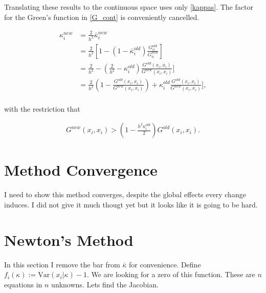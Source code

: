 \documentclass[paper=a4, fontsize=11pt]{scrartcl} %
\numberwithin{equation}{section} %
\numberwithin{figure}{section} %
\numberwithin{table}{section} %
\newcommand{\var}{\text{Var}}
\begin{document}
Translating these results to the continuous space uses only  \eqref{kappas}. The
factor for the Green's function in \eqref{G_cont} is conveniently cancelled.

\begin{align*}
  \kappa^{new}_i &= \frac{2}{h^2} \bar{\kappa}^{new}_i \\
  &= \frac{2}{h^2}[1 -  (1 - \bar{\kappa}^{old}_i)\frac{G^{old}_{ii}}{G^{new}_{ii}}] \\
  &= \frac{2}{h^2} -  (\frac{2}{h^2} - \kappa^{old}_i)\frac{G^{old}(x_i,x_i)}{G^{new}(x_i,x_i)}] \\
  &= \frac{2}{h^2}(1-\frac{G^{old}(x_i,x_i)}{G^{new}(x_i,x_i)}) + \kappa^{old}_i\frac{G^{old}(x_i,x_i)}{G^{new}(x_i,x_i)}], \\
\end{align*}

with the restriction that


\begin{align}\label{criterion_cont}
G^{new}(x_i,x_i) > ( 1 - \frac{h^2\kappa^{old}_i}{2})G^{old}(x_i,x_i).
\end{align}

\section{Method Convergence}
I need to show this method converges, despite the global effects every change induces.
I did not give it much thougt yet but it looks like it is going to be hard.


\section{Newton's Method}
In this section I remove the bar from $\bar{\kappa}$
for convenience.
Define $f_{i}(\kappa) :=\var( x_i | \kappa) -1$. We 
are looking for a zero of this function. These are $n$ equations
in $n$ unknowns. Lets find the Jacobian.
\end{document}
